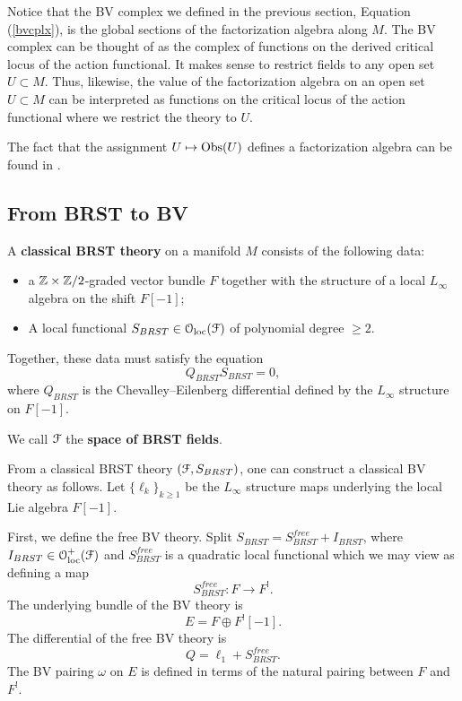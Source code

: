 \documentclass[10pt, oneside]{article}
\begin{document}
Notice that the BV complex we defined in the previous section, Equation (\ref{bvcplx}), is the global sections of the factorization algebra along $M$.
The BV complex can be thought of as the complex of functions on the derived critical locus of the action functional.
It makes sense to restrict fields to any open set $U \subset M$. 
Thus, likewise, the value of the factorization algebra on an open set $U \subset M$ can be interpreted as functions on the critical locus of the action functional where we restrict the theory to $U$. 

The fact that the assignment $U \mapsto \mathrm{Obs}(U)$ defines a factorization algebra can be found in \cite[Section 3]{Book2}. 

\subsection{From BRST to BV}

\begin{definition}
A {\bf classical BRST theory} on a manifold $M$ consists of the following data:
\begin{itemize}
\item a $\mathbb Z\times\mathbb Z/2$-graded vector bundle $F$ together with the structure of a local $L_\infty$ algebra on the shift $F[-1]$;
\item A local functional $S_{BRST} \in \mathcal{O}_{\rm loc}(\mathcal F)$ of polynomial degree $\geq 2$.
\end{itemize}
Together, these data must satisfy the equation
\[Q_{BRST} S_{BRST} = 0,\]
where $Q_{BRST}$ is the Chevalley--Eilenberg differential defined by the $L_\infty$ structure on $F[-1]$. 
\end{definition}

We call $\mathcal F$ the {\bf space of BRST fields}.

From a classical BRST theory $(\mathcal F, S_{BRST})$, one can construct a classical BV theory as follows. Let $\{\ell_k\}_{k\geq 1}$ be the $L_\infty$ structure maps underlying the local Lie algebra $F[-1]$.

First, we define the free BV theory. Split $S_{BRST} = S^{free}_{BRST} + I_{BRST}$, where $I_{BRST}\in\mathcal{O}_{\rm loc}^+(\mathcal F)$ and $S^{free}_{BRST}$ is a quadratic local functional which we may view as defining a map
\[S^{free}_{BRST}\colon F\rightarrow F^!.\]
The underlying bundle of the BV theory is
\[
E = F \oplus F^! [-1].
\]
The differential of the free BV theory is
\[
Q = \ell_1 + S^{free}_{BRST}.
\]
The BV pairing $\omega$ on $E$ is defined in terms of the natural pairing between $F$ and $F^!$.
\end{document}
